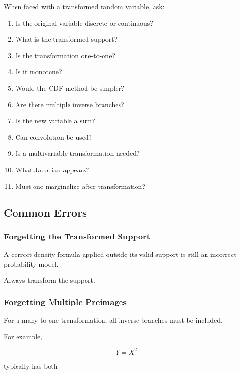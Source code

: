When faced with a transformed random variable, ask:

\begin{enumerate}
    \item Is the original variable discrete or continuous?
    \item What is the transformed support?
    \item Is the transformation one-to-one?
    \item Is it monotone?
    \item Would the CDF method be simpler?
    \item Are there multiple inverse branches?
    \item Is the new variable a sum?
    \item Can convolution be used?
    \item Is a multivariable transformation needed?
    \item What Jacobian appears?
    \item Must one marginalize after transformation?
\end{enumerate}

\subsection{Common Errors}
\label{subsec:functions-random-variables-common-errors}

\subsubsection{Forgetting the Transformed Support}

A correct density formula applied outside its valid support is still an
incorrect probability model.

Always transform the support.

\subsubsection{Forgetting Multiple Preimages}

For a many-to-one transformation, all inverse branches must be included.

For example,

\[
Y=X^2
\]

typically has both

